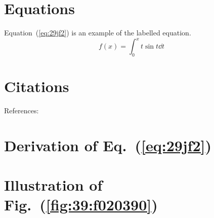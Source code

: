 \documentclass{article}
\begin{document}
\section{Equations}
Equation~(\ref{eq:29jf2}) is an example of the labelled equation.
\begin{equation}
    f(x) = \int_0^x t\sin t \dd t
    \label{eq:29jf2}
\end{equation}

\section{Citations}
References: \cite{Zhong2020InsertionLossThin}



\begin{appendices}

\section{Derivation of Eq.~(\ref{eq:29jf2})}
\lipsum[1]

\lipsum[1]

\lipsum[1]

\section{Illustration of Fig.~(\ref{fig:39:f020390})}
\lipsum[1]

\lipsum[1]
\end{appendices}




\end{document}
